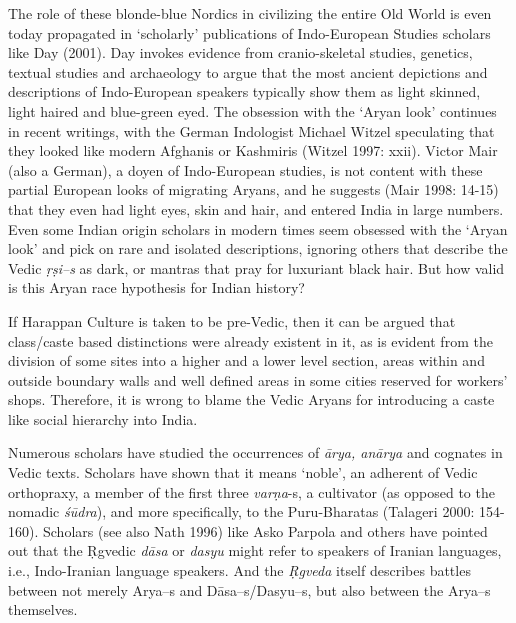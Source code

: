 The role of these blonde-blue Nordics in civilizing the entire Old World is even today propagated in ‘scholarly’ publications of Indo-European Studies scholars like Day (2001). Day invokes evidence from cranio-skeletal studies, genetics, textual studies and archaeology to argue that the most ancient depictions and descriptions of Indo-European speakers typically show them as light skinned, light haired and blue-green eyed. The obsession with the ‘Aryan look’ continues in recent writings, with the German Indologist Michael Witzel speculating that they looked like modern Afghanis or Kashmiris (Witzel 1997: xxii). Victor Mair (also a German), a doyen of Indo-European studies, is not content with these partial European looks of migrating Aryans, and he suggests (Mair 1998: 14-15) that they even had light eyes, skin and hair, and entered India in large numbers. Even some Indian origin scholars in modern times seem obsessed with the ‘Aryan look’ and pick on rare and isolated descriptions, ignoring others that describe the Vedic \textit{ṛṣi--s} as dark, or mantras that pray for luxuriant black hair. But how valid is this Aryan race hypothesis for Indian history?

If Harappan Culture is taken to be pre-Vedic, then it can be argued that class/caste based distinctions were already existent in it, as is evident from the division of some sites into a higher and a lower level section, areas within and outside boundary walls and well defined areas in some cities reserved for workers’ shops. Therefore, it is wrong to blame the Vedic Aryans for introducing a caste like social hierarchy into India.

Numerous scholars have studied the occurrences of \textit{ārya, anārya} and cognates in Vedic texts. Scholars have shown that it means ‘noble’, an adherent of Vedic orthopraxy, a member of the first three \textit{varṇa}-s, a cultivator (as opposed to the nomadic \textit{śūdra}), and more specifically, to the Puru-Bharatas (Talageri 2000: 154-160). Scholars (see also Nath 1996) like Asko Parpola and others have pointed out that the Ṛgvedic \textit{dāsa} or \textit{dasyu} might refer to speakers of Iranian languages, i.e., Indo-Iranian language speakers. And the \textit{Ṛgveda} itself describes battles between not merely Arya--s and Dāsa--s/Dasyu--s, but also between the Arya--s themselves.

